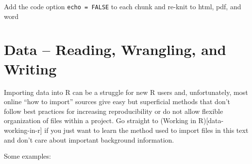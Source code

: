 \documentclass[]{book}
\begin{document}
Add the code option \texttt{echo\ =\ FALSE} to each chunk and re-knit to html, pdf, and word

\hypertarget{data-reading-wrangling-and-writing}{%
\chapter{Data -- Reading, Wrangling, and Writing}\label{data-reading-wrangling-and-writing}}

Importing data into R can be a struggle for new R users and, unfortunately, most online ``how to import'' sources give easy but superficial methods that don't follow best practices for increasing reproducibility or do not allow flexible organization of files within a project. Go straight to (Working in R){[}data-working-in-r{]} if you just want to learn the method used to import files in this text and don't care about important background information.

Some examples:
\end{document}
